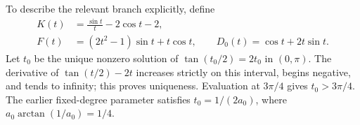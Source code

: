 To describe the relevant branch explicitly, define
\begin{align}
 K(t)&=\frac{\sin t}{t}-2\cos t-2,
 \label{aud:fr:K}\\
 F(t)&=(2t^2-1)\sin t+t\cos t,\qquad
 D_0(t)=\cos t+2t\sin t.
 \label{aud:fr:FD}
\end{align}
Let $t_0$ be the unique nonzero solution of $\tan(t_0/2)=2t_0$ in $(0,\pi)$. The derivative of $\tan(t/2)-2t$ increases strictly on this interval, begins negative, and tends to infinity; this proves uniqueness. Evaluation at $3\pi/4$ gives $t_0>3\pi/4$. The earlier fixed-degree parameter satisfies $t_0=1/(2a_0)$, where $a_0\arctan(1/a_0)=1/4$.


